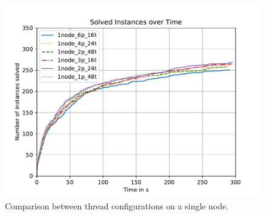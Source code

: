 \documentclass[12pt,a4paper,twoside]{scrartcl}
\numberwithin{equation}{section}
\begin{document}
\begin{figure}[!h]
  \center
  \includegraphics[scale=.5]{plots/config_compare/1node_config_compare.pdf}
  \caption{Comparison between thread configurations on a single node.}
  \label{fig:1nodeConfigCompare}
\end{figure}
\end{document}
